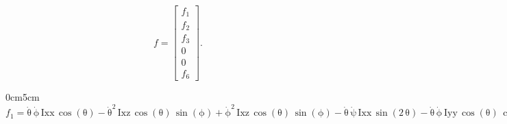 $$
f = \begin{bmatrix}
f_1 \\
f_2 \\
f_3 \\
0 \\
0 \\
f_6
\end{bmatrix}.
$$
\begin{changemargin}{0cm}{5cm}
$f_1 = \mathrm{\dot \theta}\,\mathrm{\dot \phi}\,\mathrm{Ixx}\,\cos\left(\mathrm{\theta}\right)-{\mathrm{\dot \theta}}^2\,\mathrm{Ixz}\,\cos\left(\mathrm{\theta}\right)\,\sin\left(\mathrm{\phi}\right)+{\mathrm{\dot \phi}}^2\,\mathrm{Ixz}\,\cos\left(\mathrm{\theta}\right)\,\sin\left(\mathrm{\phi}\right)-\mathrm{\dot \theta}\,\mathrm{\dot \psi}\,\mathrm{Ixx}\,\sin\left(2\,\mathrm{\theta}\right)-\mathrm{\dot \theta}\,\mathrm{\dot \phi}\,\mathrm{Iyy}\,\cos\left(\mathrm{\theta}\right)\,{\cos\left(\mathrm{\phi}\right)}^2+\mathrm{\dot \theta}\,\mathrm{\dot \phi}\,\mathrm{Izz}\,\cos\left(\mathrm{\theta}\right)\,{\cos\left(\mathrm{\phi}\right)}^2+2\,\mathrm{\dot \theta}\,\mathrm{\dot \psi}\,\mathrm{Ixz}\,{\cos\left(\mathrm{\theta}\right)}^2\,\cos\left(\mathrm{\phi}\right)+\mathrm{\dot \theta}\,\mathrm{\dot \phi}\,\mathrm{Iyy}\,\cos\left(\mathrm{\theta}\right)\,{\sin\left(\mathrm{\phi}\right)}^2-\mathrm{\dot \theta}\,\mathrm{\dot \phi}\,\mathrm{Izz}\,\cos\left(\mathrm{\theta}\right)\,{\sin\left(\mathrm{\phi}\right)}^2-2\,\mathrm{\dot \theta}\,\mathrm{\dot \psi}\,\mathrm{Ixz}\,\cos\left(\mathrm{\phi}\right)\,{\sin\left(\mathrm{\theta}\right)}^2+{\mathrm{\dot \theta}}^2\,\mathrm{Iyy}\,\cos\left(\mathrm{\phi}\right)\,\sin\left(\mathrm{\theta}\right)\,\sin\left(\mathrm{\phi}\right)-{\mathrm{\dot \theta}}^2\,\mathrm{Izz}\,\cos\left(\mathrm{\phi}\right)\,\sin\left(\mathrm{\theta}\right)\,\sin\left(\mathrm{\phi}\right)+2\,\mathrm{\dot \theta}\,\mathrm{\dot \psi}\,\mathrm{Izz}\,\cos\left(\mathrm{\theta}\right)\,{\cos\left(\mathrm{\phi}\right)}^2\,\sin\left(\mathrm{\theta}\right)-2\,\mathrm{\dot \phi}\,\mathrm{\dot \psi}\,\mathrm{Iyy}\,{\cos\left(\mathrm{\theta}\right)}^2\,\cos\left(\mathrm{\phi}\right)\,\sin\left(\mathrm{\phi}\right)+2\,\mathrm{\dot \phi}\,\mathrm{\dot \psi}\,\mathrm{Izz}\,{\cos\left(\mathrm{\theta}\right)}^2\,\cos\left(\mathrm{\phi}\right)\,\sin\left(\mathrm{\phi}\right)+2\,\mathrm{\dot \theta}\,\mathrm{\dot \psi}\,\mathrm{Iyy}\,\cos\left(\mathrm{\theta}\right)\,\sin\left(\mathrm{\theta}\right)\,{\sin\left(\mathrm{\phi}\right)}^2-2\,\mathrm{\dot \phi}\,\mathrm{\dot \psi}\,\mathrm{Ixz}\,\cos\left(\mathrm{\theta}\right)\,\sin\left(\mathrm{\theta}\right)\,\sin\left(\mathrm{\phi}\right)$


\end{changemargin}

